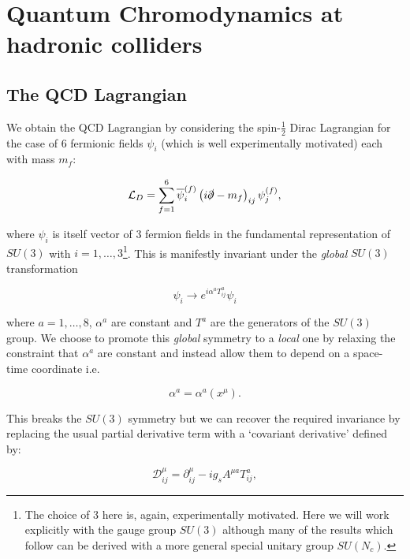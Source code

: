 \chapter{Quantum Chromodynamics at hadronic colliders}
\label{chap:theory}

\section{The QCD Lagrangian}

	We obtain the QCD Lagrangian by considering the spin-$\frac{1}{2}$ Dirac Lagrangian for the case of 6
	fermionic fields $\psi_i$ (which is well experimentally motivated) each with mass $m_f$:

	\begin{equation}
		\mathcal{L}_D = \sum_{f=1}^{6}\overline{\psi}_i^{(f)}\left(i\slashed{\partial}- m_f\right)_{ij}\psi_j^{(f)},
		\label{eqn:QCDLagrangian}
	\end{equation}

	\noindent where $\psi_i$ is itself vector of 3 fermion fields in the fundamental
	representation of $SU(3)$ with $i=1,\ldots,3$\footnote{The choice of 3 here is, again, experimentally motivated.
	Here we will work explicitly with the gauge group $SU(3)$ although many of the results which follow can
	be derived with a more general special unitary group $SU(N_c)$.}. This is manifestly invariant under the \emph{global}
	$SU(3)$ transformation

	\begin{equation}
		\psi_i\rightarrow e^{i\alpha^aT^a_{ij}}\psi_i
	\end{equation}

	\noindent where $a=1,\ldots,8$, $\alpha^a$ are constant and $T^a$ are the generators of the $SU(3)$ group.
	We choose to promote this \emph{global} symmetry to a \emph{local} one by relaxing the constraint that $\alpha^a$ are
	constant and instead allow them to depend on a space-time coordinate i.e.

	\begin{equation}
		\alpha^a = \alpha^a(x^\mu).
	\end{equation}

	This breaks the $SU(3)$ symmetry but we can recover the required invariance by replacing the
	usual partial derivative term with a `covariant derivative' defined by:

	\begin{equation}
		\mathcal{D}^\mu_{ij} = \partial^\mu_{ij} - ig_sA^{\mu a}T^a_{ij},
	\end{equation}

